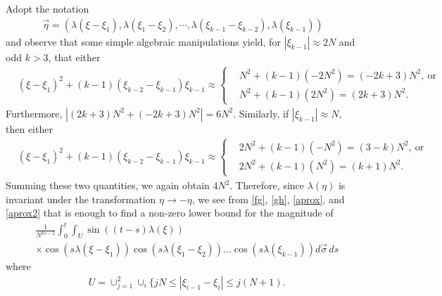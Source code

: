 \documentclass{amsart}
\begin{document}
Adopt the notation
\begin{equation*}
\begin{split}
  \vec{\eta} = \left( \lambda(\xi - \xi_{1}), \lambda(\xi_{1} - \xi_{2}), \cdots, \lambda(\xi_{k-1} - \xi_{k-2}), \lambda(\xi_{k-1}) \right)
\end{split}
\end{equation*}
and observe that some simple algebraic manipulations yield, for $| \xi_{k-1} | \approx 2N$ and odd $k > 3$, that either
\begin{equation}
  \label{aprox}
\begin{split}
& 
(\xi - \xi_{1})^{2} + (k-1)(\xi_{k-2} - \xi_{k-1})\xi_{k-1}
\approx 
\begin{cases}
  & N^{2} + (k-1)(-2N^{2}) = (-2k+3)N^{2}, \ \text{or} 
 \\
 & N^{2} + (k-1)(2N^{2}) = (2k+3)N^{2}.
 \end{cases}
\end{split}
\end{equation}
Furthermore, $|(2k+3)N^{2} + (-2k + 3)N^{2}| = 6N^{2}$. Similarly, if
$| \xi_{k-1} | \approx N$, then either
\begin{equation}
  \label{aprox2}
\begin{split}
& 
(\xi - \xi_{1})^{2} + (k-1)(\xi_{k-2} - \xi_{k-1})\xi_{k-1}
\approx 
\begin{cases}
 & 2N^{2} + (k-1)(-N^{2}) = (3-k)N^{2}, \ \text{or}
 \\
 & 2N^{2} + (k-1)(N^{2}) = (k+1) N^{2}.
 \end{cases}
\end{split}
\end{equation}
Summing these two quantities, we again obtain $4N^{2}$. Therefore, since $\lambda(\eta)$ is invariant under the transformation $\eta \to -\eta$, 
we see from \eqref{fg}, \eqref{gh}, \eqref{aprox}, and \eqref{aprox2} that is enough to find a non-zero lower bound for the magnitude of
\begin{equation}
\begin{split}
& \frac{1}{N^{ks-2}}\int_0^t 
\int_U
\sin((t-s) \lambda(\xi))
\\
& \times 
\cos(s \lambda(\xi- \xi_{1}))
\cos(s \lambda(\xi_{1}- \xi_{2}))\dots\cos(s\lambda(\xi_{k-1}))
d \vec{\sigma}\,ds
\end{split}
\end{equation}
where
\begin{equation*}
\begin{split}
  & U = 
{\cup_{j=1}^{2} \cup_{i}\{jN \leq |\xi_{i-1}-\xi_{i}|\leq j(N+1)}.
  \end{split}
\end{equation*}
\end{document}
